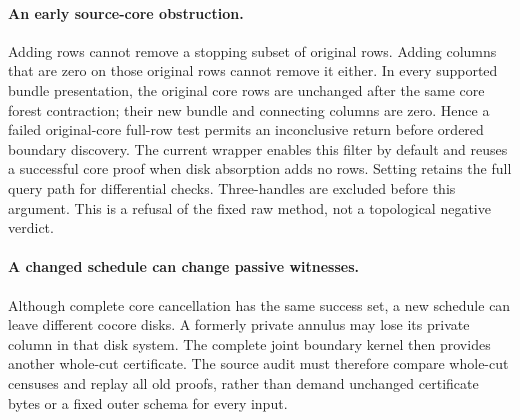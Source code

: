 \paragraph{An early source-core obstruction.}
Adding rows cannot remove a stopping subset of original rows. Adding columns
that are zero on those original rows cannot remove it either. In every
supported bundle presentation, the original core rows are unchanged after
the same core forest contraction; their new bundle and connecting columns
are zero. Hence a failed original-core full-row test permits an inconclusive
return before ordered boundary discovery. The current wrapper enables this
filter by default and reuses a successful core proof when disk absorption
adds no rows. Setting  retains the full query path
for differential checks. Three-handles are excluded before this argument.
This is a refusal of the fixed raw method, not a topological negative verdict.

\paragraph{A changed schedule can change passive witnesses.}
Although complete core cancellation has the same success set, a new schedule
can leave different cocore disks. A formerly private annulus may lose its
private column in that disk system. The complete joint boundary kernel then
provides another whole-cut certificate. The source audit must therefore compare
whole-cut censuses and replay all old proofs, rather than demand unchanged
certificate bytes or a fixed outer schema for every input.


